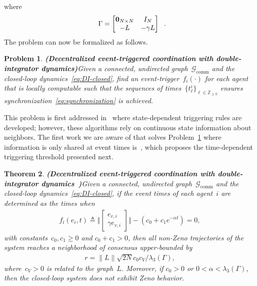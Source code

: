 \documentclass{autart}
\newtheorem{theorem}{Theorem}[section]
\newtheorem{problem}[theorem]{Problem}
\newcommand{\integernonnegative}{\mathbb{Z}_{\ge 0}}
\newcommand{\GG}{{\mathcal{G}}}
\newcommand{\commgraph}{\GG_\text{comm}}
\newcommand{\TwoNorm}[1]{\|#1\|}
\newcommand{\longthmtitle}[1]{\mbox{}\textup{\textbf{(#1)}}}
\begin{document}
where
\begin{align}
  \left.
	\begin{array}{l l}
          \Gamma=\begin{bmatrix}
            \mathbf{0}_{N \times N} & I_N \\
            - {L} & -\gamma {L}
\end{bmatrix} 
   \end{array}  \right. . \label{eq:Gamma}
\end{align}
The problem can now be formalized as follows.

\begin{problem}\longthmtitle{Decentralized event-triggered
    coordination with double-integrator dynamics}\label{pr:DI} 
  Given a connected, undirected graph~$\commgraph$ and the closed-loop
  dynamics~\eqref{eq:DI-closed}, find an event-trigger~$f_i(\cdot)$
  for each agent that is locally computable such that the sequences of
  times~$\{t_\ell^i\}_{\ell \in \integernonnegative}$ ensures
  synchronization~\eqref{eq:synchronization} is achieved.
\end{problem}

This problem is first addressed
in~\citep{DX-SX-ZL-YZ:15,MC-FX-LW:14} where state-dependent
triggering rules are developed; however, these algorithms rely on continuous
state information about neighbors. The first work we are aware of that solves
Problem~\ref{pr:DI} where information is only shared at event times
is~\citep{GSS-DVD-KHJ:13}, which proposes the time-dependent triggering
threshold presented next.

\begin{theorem}\longthmtitle{Decentralized event-triggered
    coordination with double-integrator
    dynamics~\citep{GSS-DVD-KHJ:13}}\label{th:DI-time} 
  Given {a connected, undirected graph~$\commgraph$ and} the
  closed-loop dynamics~\eqref{eq:DI-closed}, if the event times of
  each agent~$i$ are determined as the times when
  \begin{align}\label{eq:DI-trigger-time}
    f_i(e_i,t) \triangleq \Big\Vert \left[ 
      \begin{array}{c}
        e_{r,i}
        \\
        \gamma e_{v,i}
      \end{array}
    \right] \Big\Vert - (c_0 + c_1 e^{-\alpha t}) = 0,
  \end{align}
  with constants~$c_0,c_1 \geq 0$ and $c_0 + c_1 > 0$, then all
  non-Zeno trajectories of the system reaches a neighborhood of
  consensus upper-bounded by
  \begin{align*}
    r = \TwoNorm{L} \sqrt{2N} c_0 c_V / \lambda_3(\Gamma) ,
  \end{align*}
  where~$c_V > 0$ is related to the graph~$L$. Moreover, if $c_0 > 0$
  or $0 < \alpha < \lambda_3(\Gamma)$, then the closed-loop system
  does not exhibit Zeno behavior.
\end{theorem}
\end{document}
